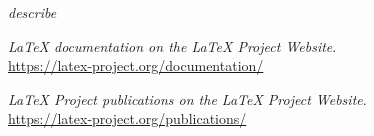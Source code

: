 \documentclass{ltnews}
\begin{document}
\emph{describe}


\begin{thebibliography}{9}
  
  \emph{\LaTeX{} documentation on the \LaTeX{} Project Website}.\\  
  \url{https://latex-project.org/documentation/}

  \emph{\LaTeX{} Project publications on the \LaTeX{} Project Website}.\\
  \url{https://latex-project.org/publications/}

\end{thebibliography}
\end{document}
